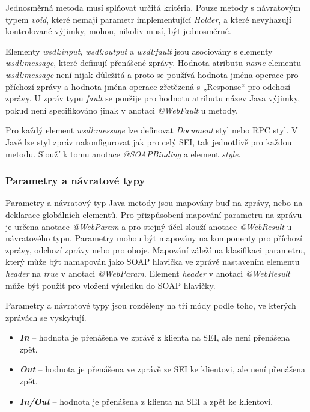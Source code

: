 \documentclass[11pt,twoside,a4paper]{book}
\begin{document}
Jednosměrná metoda musí splňovat určitá kritéria. Pouze metody s
návratovým typem {\em void}, které nemají parametr implementující {\em
Holder}, a které nevyhazují kontrolované výjimky, mohou, nikoliv musí, být jednosměrné.

Elementy {\em wsdl:input}, {\em wsdl:output} a {\em wsdl:fault} jsou asociovány
s elementy {\em wsdl:message}, které definují přenášené zprávy. Hodnota atributu
{\em name} elementu {\em wsdl:message} není nijak důležitá a proto se používá
hodnota jména operace pro příchozí zprávy a hodnota jména operace zřetězená s
„Response“ pro odchozí zprávy. U zpráv typu {\em fault} se použije pro hodnotu
atributu název Java výjimky, pokud není specifikováno jinak v anotaci {\em
@WebFault} u metody.

Pro každý element {\em wsdl:message} lze definovat {\em Document} styl nebo RPC
styl.
V Javě lze styl zpráv nakonfigurovat jak pro celý SEI, tak jednotlivě pro každou
metodu. Slouží k tomu anotace {\em @SOAPBinding} a element {\em style}.

\subsubsection{Parametry a návratové typy}

Parametry a návratový typ Java metody jsou mapovány buď na zprávy, nebo na
deklarace globálních elementů. Pro přizpůsobení mapování parametru na zprávu je určena
anotace {\em @WebParam} a pro stejný účel slouží anotace {\em @WebResult} u
návratového typu. Parametry mohou být mapovány na komponenty pro příchozí zprávy, odchozí zprávy nebo pro oboje.
Mapování záleží na klasifikaci parametru, který může být namapován jako SOAP
hlavička ve zprávě nastavením elementu {\em header} na {\em true} v anotaci
{\em @WebParam}.
Element {\em header} v anotaci {\em @WebResult} může být použit pro vložení
výsledku do SOAP hlavičky.

Parametry a návratové typy jsou rozděleny na tři módy podle toho, ve kterých zprávách se
vyskytují.

\begin{itemize}
  \item \textbf{\textit{In}} – hodnota je přenášena ve zprávě z klienta na
  SEI, ale není přenášena zpět.
  \item \textbf{\textit{Out}} – hodnota je přenášena ve zprávě ze SEI ke
  klientovi, ale není přenášena zpět.
  \item \textbf{\textit{In/Out}} – hodnota je přenášena z klienta na SEI a
  zpět ke klientovi.
\end{itemize}
\end{document}
